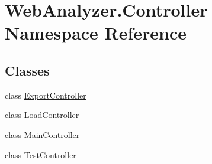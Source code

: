 \hypertarget{namespace_web_analyzer_1_1_controller}{}\section{Web\+Analyzer.\+Controller Namespace Reference}
\label{namespace_web_analyzer_1_1_controller}
\subsection*{Classes}
\begin{DoxyCompactItemize}
\item 
class \hyperlink{class_web_analyzer_1_1_controller_1_1_export_controller}{Export\+Controller}
\item 
class \hyperlink{class_web_analyzer_1_1_controller_1_1_load_controller}{Load\+Controller}
\item 
class \hyperlink{class_web_analyzer_1_1_controller_1_1_main_controller}{Main\+Controller}
\item 
class \hyperlink{class_web_analyzer_1_1_controller_1_1_test_controller}{Test\+Controller}
\end{DoxyCompactItemize}
